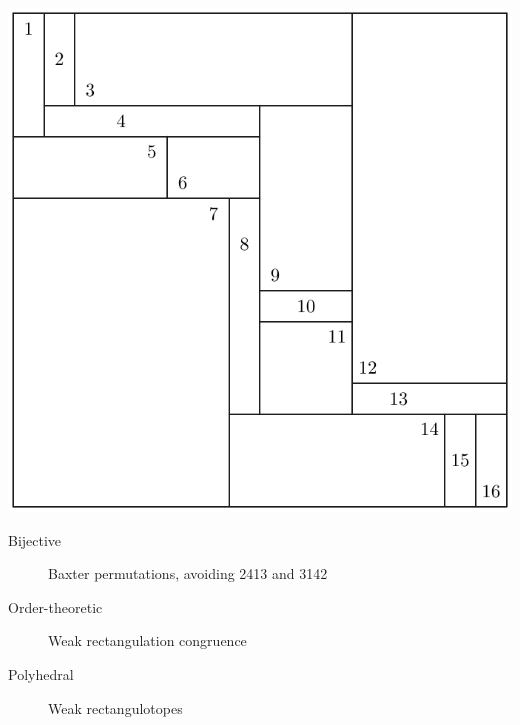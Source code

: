 \documentclass[11pt]{beamer}%
\newcommand{\red}{\color{darkred}}
\newcommand{\green}{\color{darkgreen}}
\renewcommand{\em }{\red}
\begin{document}
\begin{frame}
\begin{center}
      \includegraphics[height=.4\textheight]{weakRectangulation.pdf}
    \end{center}  
  \pause
  \begin{description}
  \item[Bijective] {\em Baxter} permutations, avoiding 2{\green 41}3 and 3{\green 14}2
    \pause
  \item[Order-theoretic] Weak rectangulation congruence
  \item[Polyhedral] Weak rectangulotopes
  \end{description}
\end{frame}
\end{document}
